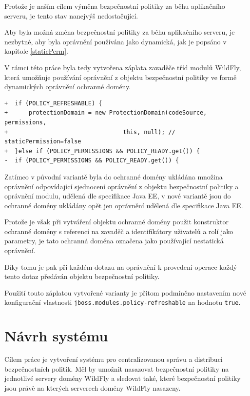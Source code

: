 Protože je naším cílem výměna bezpečnostní politiky za běhu aplikačního serveru, je tento stav nanejvýš nedostačující.

Aby byla možná změna bezpečnostní politiky za běhu aplikačního serveru, je nezbytné, aby byla oprávnění používána jako dynamická, jak je popsáno v kapitole \ref{staticPerm}.

V rámci této práce byla tedy vytvořena záplata zavaděče tříd modulů WildFly, která umožňuje používání oprávnění z objektu bezpečnostní politiky
ve formě dynamických oprávnění ochranné domény.

\begin{lstlisting}[caption=Hlavní část záplaty umožňující nastavit používání dynamických oprávnění, label=refreshable]
+  if (POLICY_REFRESHABLE) {
+      protectionDomain = new ProtectionDomain(codeSource, permissions,
+                                 this, null); // staticPermission=false
+  }else if (POLICY_PERMISSIONS && POLICY_READY.get()) {
-  if (POLICY_PERMISSIONS && POLICY_READY.get()) {
\end{lstlisting}

Zatímco v původní variantě byla do ochranné domény ukládána množina oprávnění odpovídající sjednocení oprávnění z objektu bezpečnostní politiky a oprávnění modulu, udělená dle specifikace Java EE, v nové variantě jsou do ochranné domény ukládány opět jen oprávnění udělená dle specifikace Java EE.

Protože je však při vytváření objektu ochranné domény použit konstruktor ochranné domény s referencí na zavaděč a identifikátory uživatelů a rolí jako parametry, je tato ochranná doména označena jako používající nestatická oprávnění.

Díky tomu je pak při každém dotazu na oprávnění k provedení operace každý tento dotaz předáván objektu bezpečnostní politiky.

Použití touto záplatou vytvořené varianty je přitom podmíněno nastavením nové konfigurační vlastnosti {\tt jboss.modules.policy-refreshable} na hodnotu {\tt true}.

\chapter{Návrh systému} \label{navrh}

Cílem práce je vytvoření systému pro centralizovanou správu a distribuci bezpečnostních politik. Měl by umožnit nasazovat bezpečnostní politiky na jednotlivé servery domény WildFly a sledovat také, které bezpečnostní politiky jsou právě na kterých serverech domény WildFly nasazeny.

